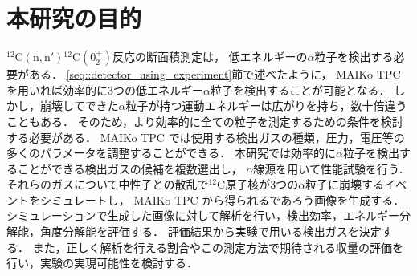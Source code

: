 \documentclass[../master]{subfiles}
\begin{document}

\section{本研究の目的}
${}^{12}\mathrm{C}(\mathrm{n},\mathrm{n}'){}^{12}\mathrm{C} (0_2^+)$反応の断面積測定は，
低エネルギーの$\alpha$粒子を検出する必要がある．
\ref{seq::detector_using_experiment}節で述べたように，
MAIKo TPC を用いれば効率的に3つの低エネルギー$\alpha$粒子を検出することが可能となる．
しかし，崩壊してできた$\alpha$粒子が持つ運動エネルギーは広がりを持ち，数十倍違うこともある．
そのため，より効率的に全ての粒子を測定するための条件を検討する必要がある．
MAIKo TPC では使用する検出ガスの種類，圧力，電圧等の多くのパラメータを調整することができる．
本研究では効率的に$\alpha$粒子を検出することができる検出ガスの候補を複数選出し，
$\alpha$線源を用いて性能試験を行う．
それらのガスについて中性子との散乱で${}^{12}\mathrm{C}$原子核が3つの$\alpha$粒子に崩壊するイベントをシミュレートし，
MAIKo TPC から得られるであろう画像を生成する．
シミュレーションで生成した画像に対して解析を行い，検出効率，エネルギー分解能，角度分解能を評価する．
評価結果から実験で用いる検出ガスを決定する．
また，正しく解析を行える割合やこの測定方法で期待される収量の評価を行い，実験の実現可能性を検討する．
\end{document}
